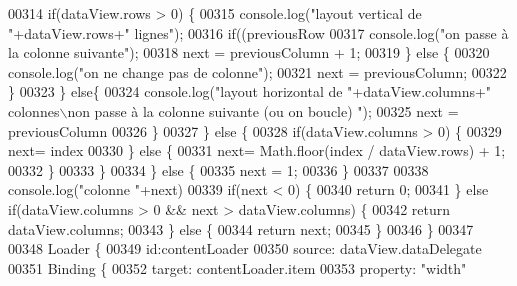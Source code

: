 \begin{DoxyCode}
{00314                         \textcolor{keywordflow}{if}(dataView.rows > 0) \{
00315                             console.log(\textcolor{stringliteral}{"layout vertical de "}+dataView.rows+\textcolor{stringliteral}{" lignes"});
00316                             \textcolor{keywordflow}{if}((previousRow %
00317                                 console.log(\textcolor{stringliteral}{"on passe à la colonne suivante"});
00318                                 next = previousColumn + 1;
00319                             \} \textcolor{keywordflow}{else} \{
00320                                 console.log(\textcolor{stringliteral}{"on ne change pas de colonne"});
00321                                 next = previousColumn;
00322                             \}
00323                         \} \textcolor{keywordflow}{else}\{
00324                             console.log(\textcolor{stringliteral}{"layout horizontal de "}+dataView.columns+\textcolor{stringliteral}{" colonnes\(\backslash\)non passe à la
       colonne suivante (ou on boucle) "});
00325                             next = previousColumn %
00326                         \}
00327                     \} \textcolor{keywordflow}{else} \{
00328                         \textcolor{keywordflow}{if}(dataView.columns > 0) \{
00329                             next= index %
00330                         \} \textcolor{keywordflow}{else} \{
00331                             next= Math.floor(index / dataView.rows) + 1;
00332                         \}
00333                     \}
00334                 \} \textcolor{keywordflow}{else} \{
00335                     next = 1;
00336                 \}
00337 
00338                 console.log(\textcolor{stringliteral}{"colonne "}+next)
00339                 \textcolor{keywordflow}{if}(next < 0) \{
00340                     \textcolor{keywordflow}{return} 0;
00341                 \} \textcolor{keywordflow}{else} \textcolor{keywordflow}{if}(dataView.columns > 0 && next > dataView.columns) \{
00342                     \textcolor{keywordflow}{return} dataView.columns;
00343                 \} \textcolor{keywordflow}{else} \{
00344                     \textcolor{keywordflow}{return} next;
00345                 \}
00346             \}
00347 
00348             Loader \{
00349                 \textcolor{keywordtype}{id}:contentLoader
00350                 source: dataView.dataDelegate
00351                 Binding \{
00352                     target: contentLoader.item
00353                     \textcolor{keyword}{property}: \textcolor{stringliteral}{"width"}
}
\end{DoxyCode}
